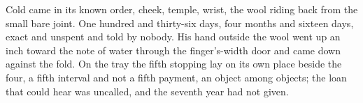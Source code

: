 Cold came in its known order, cheek, temple, wrist, the wool riding back from the small bare joint. One hundred and thirty-six days, four months and sixteen days, exact and unspent and told by nobody. His hand outside the wool went up an inch toward the note of water through the finger's-width door and came down against the fold. On the tray the fifth stopping lay on its own place beside the four, a fifth interval and not a fifth payment, an object among objects; the loan that could hear was uncalled, and the seventh year had not given.
